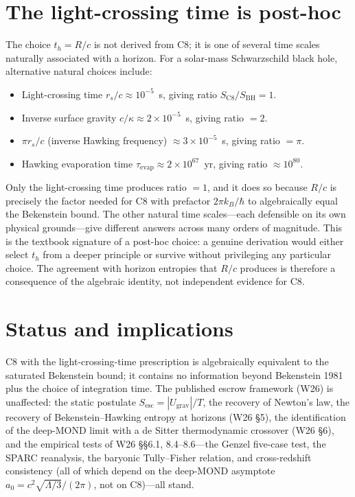 \documentclass[11pt]{article}
\newcommand{\SC}{S_{\mathrm{C8}}}
\newcommand{\Sesc}{S_{\mathrm{esc}}}
\begin{document}
\section{The light-crossing time is post-hoc}

The choice $t_{h} = R/c$ is not derived from C8; it is one of several time scales naturally associated
with a horizon. For a solar-mass Schwarzschild black hole, alternative natural choices include:
\begin{itemize}
\item Light-crossing time $r_{s}/c \approx 10^{-5}$~s, giving ratio $\SC/S_{\mathrm{BH}} = 1$.
\item Inverse surface gravity $c/\kappa \approx 2\times 10^{-5}$~s, giving ratio $= 2$.
\item $\pi r_{s}/c$ (inverse Hawking frequency) $\approx 3\times 10^{-5}$~s, giving ratio $= \pi$.
\item Hawking evaporation time $\tau_{\mathrm{evap}} \approx 2\times 10^{67}$~yr, giving ratio
$\approx 10^{80}$.
\end{itemize}
Only the light-crossing time produces ratio $= 1$, and it does so because $R/c$ is precisely the
factor needed for C8 with prefactor $2\pi k_{B}/\hbar$ to algebraically equal the Bekenstein bound.
The other natural time scales---each defensible on its own physical grounds---give different answers
across many orders of magnitude. This is the textbook signature of a post-hoc choice: a genuine
derivation would either select $t_{h}$ from a deeper principle or survive without privileging any
particular choice. The agreement with horizon entropies that $R/c$ produces is therefore a consequence
of the algebraic identity, not independent evidence for C8.

\section{Status and implications}

C8 with the light-crossing-time prescription is algebraically equivalent to the saturated Bekenstein
bound; it contains no information beyond Bekenstein 1981 plus the choice of integration time. The
published escrow framework (W26) is unaffected: the static postulate $\Sesc = |U_{\mathrm{grav}}|/T$,
the recovery of Newton's law, the recovery of Bekenstein--Hawking entropy at horizons (W26 \S5), the
identification of the deep-MOND limit with a de Sitter thermodynamic crossover (W26 \S6), and the
empirical tests of W26 \S\S6.1, 8.4--8.6---the Genzel five-case test, the SPARC reanalysis, the baryonic Tully--Fisher relation, and cross-redshift consistency (all of which depend on the deep-MOND asymptote $a_{0} = c^{2}\sqrt{\Lambda/3}/(2\pi)$, not on C8)---all stand.
\end{document}
